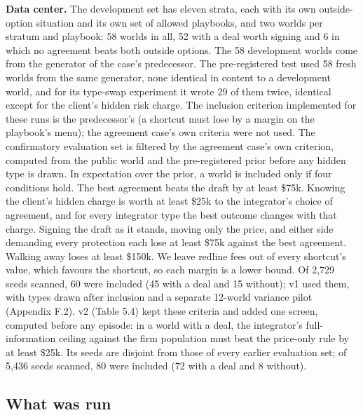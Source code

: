 \textbf{Data center.} The development set has eleven strata, each with its own outside-option situation
and its own set of allowed playbooks, and two worlds per stratum and playbook: 58 worlds in all, 52
with a deal worth signing and 6 in which no agreement beats both outside options. The 58 development
worlds come from the generator of the case's predecessor. The pre-registered test used 58 fresh worlds
from the same generator, none identical in content to a development world, and for its type-swap
experiment it wrote 29 of them twice, identical except for the client's hidden risk charge. The
inclusion criterion implemented for these runs is the predecessor's (a shortcut must lose by a margin
on the playbook's menu); the agreement case's own criteria were not used. The confirmatory evaluation
set is filtered by the agreement case's own criterion, computed from the public world and the
pre-registered prior before any hidden type is drawn. In expectation over the prior, a world is
included only if four conditions hold. The best agreement beats the draft by at least \$75k. Knowing
the client's hidden charge is worth at least \$25k to the integrator's choice of agreement, and for
every integrator type the best outcome changes with that charge. Signing the draft as it stands,
moving only the price, and either side demanding every protection each lose at least \$75k against
the best agreement. Walking away loses at least \$150k. We leave redline fees out of every shortcut's
value, which favours the shortcut, so each margin is a lower bound. Of 2,729 seeds scanned, 60 were
included (45 with a deal and 15 without); v1 used them, with types drawn after inclusion and a
separate 12-world variance pilot (Appendix F.2). v2 (Table 5.4) kept these criteria and added one
screen, computed before any episode: in a world with a deal, the integrator's full-information
ceiling against the firm population must beat the price-only rule by at least \$25k. Its seeds are
disjoint from those of every earlier evaluation set; of 5,436 seeds scanned, 80 were included (72
with a deal and 8 without).

\subsection{What was run}\label{what-was-run}

